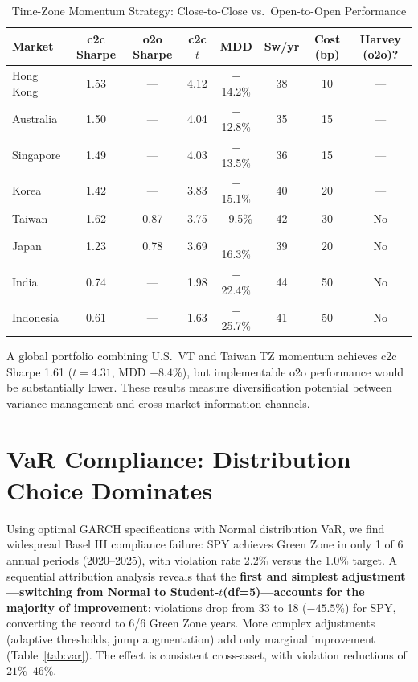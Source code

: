 \begin{table}[H]
\centering
\caption{Time-Zone Momentum Strategy: Close-to-Close vs.\ Open-to-Open Performance}
\label{tab:tz_arbitrage}
\small
\begin{tabular}{lccccccc}
\hline
Market & c2c Sharpe & o2o Sharpe & c2c $t$ & MDD & Sw/yr & Cost (bp) & Harvey (o2o)? \\
\hline
Hong Kong  & 1.53 & --- & 4.12 & $-$14.2\% & 38 & 10 & --- \\
Australia  & 1.50 & --- & 4.04 & $-$12.8\% & 35 & 15 & --- \\
Singapore  & 1.49 & --- & 4.03 & $-$13.5\% & 36 & 15 & --- \\
Korea      & 1.42 & --- & 3.83 & $-$15.1\% & 40 & 20 & --- \\
Taiwan     & 1.62 & 0.87 & 3.75 & $-$9.5\%  & 42 & 30 & No \\
Japan      & 1.23 & 0.78 & 3.69 & $-$16.3\% & 39 & 20 & No \\
\hline
India      & 0.74 & --- & 1.98 & $-$22.4\% & 44 & 50 & No \\
Indonesia  & 0.61 & --- & 1.63 & $-$25.7\% & 41 & 50 & No \\
\hline
\end{tabular}
\end{table}

A global portfolio combining U.S.\ VT and Taiwan TZ momentum achieves c2c Sharpe 1.61 ($t = 4.31$, MDD $-8.4\%$), but implementable o2o performance would be substantially lower. These results measure diversification potential between variance management and cross-market information channels.

\section{VaR Compliance: Distribution Choice Dominates}
\label{sec:var_compliance}

Using optimal GARCH specifications with Normal distribution VaR, we find widespread Basel III compliance failure: SPY achieves Green Zone in only 1 of 6 annual periods (2020--2025), with violation rate 2.2\% versus the 1.0\% target. A sequential attribution analysis reveals that the \textbf{first and simplest adjustment---switching from Normal to Student-$t$(df=5)---accounts for the majority of improvement}: violations drop from 33 to 18 ($-45.5\%$) for SPY, converting the record to 6/6 Green Zone years. More complex adjustments (adaptive thresholds, jump augmentation) add only marginal improvement (Table~\ref{tab:var}). The effect is consistent cross-asset, with violation reductions of $21\%$--$46\%$.

